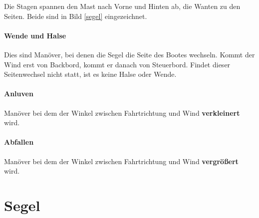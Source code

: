 \documentclass[12pt]{article}
\begin{document}
Die Stagen spannen den Mast nach Vorne und Hinten ab, die Wanten zu den Seiten. Beide sind in Bild \ref{segel} eingezeichnet.

\paragraph{Wende und Halse}
Dies sind Manöver, bei denen die Segel die Seite des Bootes wechseln. Kommt der Wind erst von Backbord, kommt er danach von Steuerbord. Findet dieser Seitenwechsel nicht statt, ist es keine Halse oder Wende.

\paragraph{Anluven}
Manöver bei dem der Winkel zwischen Fahrtrichtung und Wind \textbf{verkleinert} wird.

\paragraph{Abfallen}
Manöver bei dem der Winkel zwischen Fahrtrichtung und Wind \textbf{vergrößert} wird.

\section{Segel}
\end{document}
